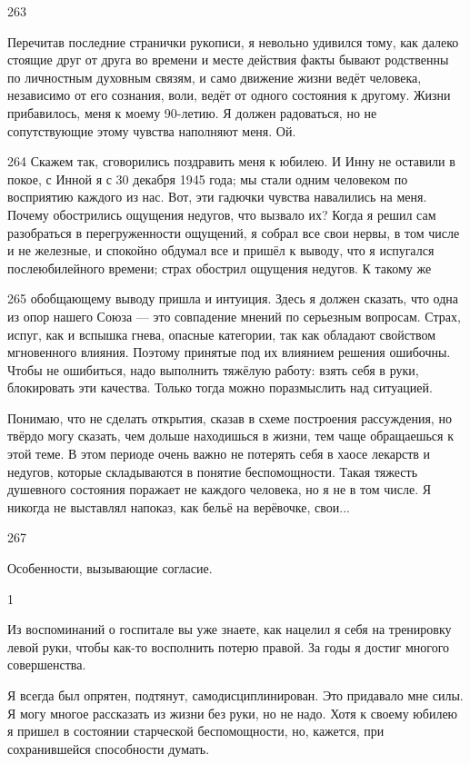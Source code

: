 263

Перечитав последние странички рукописи, я невольно удивился тому, как далеко стоящие друг от друга во времени и месте действия факты бывают родственны по личностным духовным связям, и само движение жизни ведёт человека, независимо от его сознания, воли, ведёт от одного состояния к другому. Жизни прибавилось, меня к моему 90-летию. Я должен радоваться, но не сопутствующие этому чувства наполняют меня. Ой.

264
Скажем так, сговорились поздравить меня к юбилею. И Инну не оставили в покое, с Инной я с 30 декабря 1945 года; мы стали одним человеком по восприятию каждого из нас. Вот, эти гадючки чувства навалились на меня. Почему обострились ощущения недугов, что вызвало их? Когда я решил сам разобраться в перегруженности ощущений, я собрал все свои нервы, в том числе и не железные, и спокойно обдумал все и пришёл к выводу, что я испугался послеюбилейного времени; страх обострил ощущения недугов. К такому же

265 обобщающему выводу пришла и интуиция. Здесь я должен сказать, что одна из опор нашего Союза — это совпадение мнений по серьезным вопросам. Страх, испуг, как и вспышка гнева, опасные категории, так как обладают свойством мгновенного влияния. Поэтому принятые под их влиянием решения ошибочны. Чтобы не ошибиться, надо выполнить тяжёлую работу: взять себя в руки, блокировать эти качества. Только тогда можно поразмыслить над ситуацией.

Понимаю, что не сделать открытия, сказав в схеме построения рассуждения, но твёрдо могу сказать, чем дольше находишься в жизни, тем чаще обращаешься к этой теме. В этом периоде очень важно не потерять себя в хаосе лекарств и недугов, которые складываются в понятие беспомощности. Такая тяжесть душевного состояния поражает не каждого человека, но я не в том числе. Я никогда не выставлял напоказ, как бельё на верёвочке, свои...

267

Особенности, вызывающие согласие.

1

Из воспоминаний о госпитале вы уже знаете, как нацелил я себя на тренировку левой руки, чтобы как-то восполнить потерю правой. За годы я достиг многого совершенства.

Я всегда был опрятен, подтянут, самодисциплинирован. Это придавало мне силы. Я могу многое рассказать из жизни без руки, но не надо. Хотя к своему юбилею я пришел в состоянии старческой беспомощности, но, кажется, при сохранившейся способности думать.
